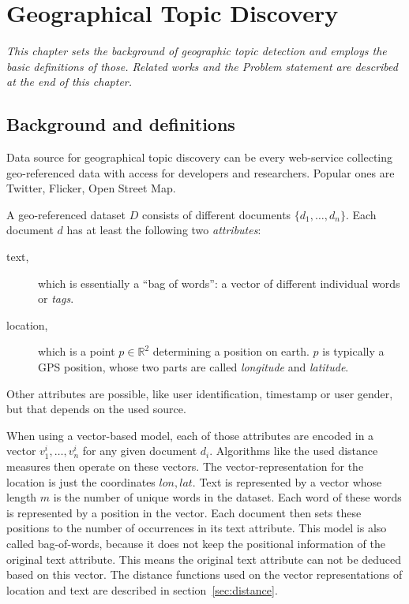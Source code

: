 
\chapter{Geographical Topic Discovery}
\emph{%
This chapter sets the background of geographic topic detection and employs the basic definitions of those. Related works and the Problem statement are described at the end of this chapter.
}\label{chap:topics}


\section{Background and definitions}
Data source for geographical topic discovery can be every web-service collecting geo-referenced data with access for developers and researchers. Popular ones are Twitter, Flicker, Open Street Map.

A geo-referenced dataset $D$ consists of different documents $\{d_1,\dots, d_n\}$. Each document $d$ has at least the following two \emph{attributes}:
\begin{description}
\item[text,] which is essentially a \enquote{bag of words}: a vector of different individual words or \emph{tags}.
\item[location,] which is a point $p \in \mathbb{R}^2$ determining a position on earth. $p$ is typically a GPS position, whose two parts are called \emph{longitude} and \emph{latitude}.
\end{description}
%
Other attributes are possible, like user identification, timestamp or user gender, but that depends on the used source. 

When using a vector-based model, each of those attributes are encoded in a vector $v^i_1, \dots, v^i_n$ for any given document $d_i$. Algorithms like the used distance measures then operate on these vectors. The vector-representation for the location is just the coordinates $lon, lat$. Text is represented by a vector whose length $m$ is the number of unique words in the dataset. Each word of these words is represented by a position in the vector. Each document then sets these positions to the number of occurrences in its text attribute. This model is also called bag-of-words, because it does not keep the positional information of the original text attribute. This means the original text attribute can not be deduced based on this vector. The distance functions used on the vector representations of location and text are described in section~\ref{sec:distance}.

